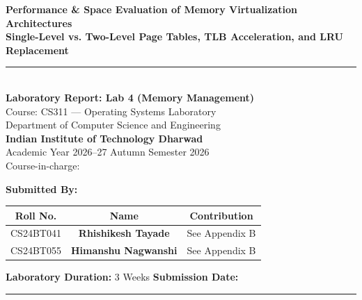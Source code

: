 \documentclass[11pt,a4paper]{article}
\begin{document}
\begin{titlepage}
    \centering
    \vspace*{1.5cm}
    
    {\Huge \bfseries \textcolor{primaryblue}{Performance \& Space Evaluation of Memory Virtualization Architectures}}\\[0.8cm]
    {\Large \textbf{Single-Level vs. Two-Level Page Tables, TLB Acceleration, and LRU Replacement}}\\[1.5cm]
    
    \rule{0.8\textwidth}{1.2pt}\\[1.5cm]
    
    \textbf{\Large Laboratory Report: Lab 4 (Memory Management)}\\[0.4cm]
    {\large Course: CS311 --- Operating Systems Laboratory}\\[0.3cm]
    {\large Department of Computer Science and Engineering}\\[0.3cm]
    {\large \textbf{Indian Institute of Technology Dharwad}}\\[0.2cm]
    {\large Academic Year 2026--27 \quad\textbar\quad Autumn Semester 2026}\\[0.2cm]
    {\small Course-in-charge: \underline{\hspace{5.5cm}}}\\[1.6cm]
    
    \begin{minipage}{0.85\textwidth}
        \centering
        \large
        \textbf{Submitted By:}\\[0.4cm]
        \begin{tabular}{ccc}
            \textbf{Roll No.} & \textbf{Name} & \textbf{Contribution} \\
            \midrule
            CS24BT041 & \textbf{Rhishikesh Tayade} & See Appendix B \\
            CS24BT055 & \textbf{Himanshu Nagwanshi} & See Appendix B
        \end{tabular}
    \end{minipage}
    
    \vfill
    
    {\large \textbf{Laboratory Duration:} 3 Weeks \quad\textbar\quad \textbf{Submission Date:} \underline{\hspace{4cm}}}\\[0.5cm]
    \rule{0.4\textwidth}{0.5pt}
\end{titlepage}
\end{document}
